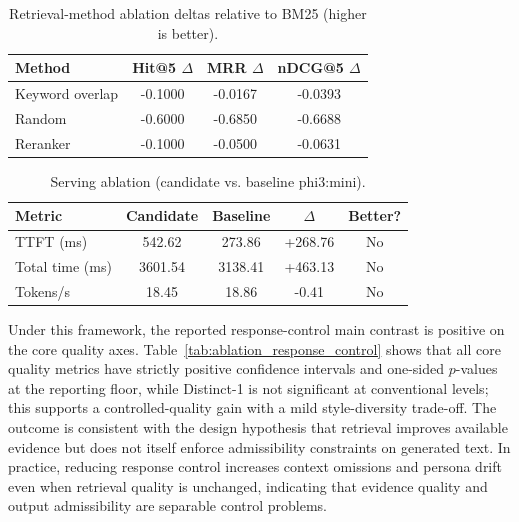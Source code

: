 ﻿\documentclass[a4paper,12pt]{article}
\begin{document}
\begin{table}[t]
\centering
\caption{Retrieval-method ablation deltas relative to BM25 (higher is better).}
\label{tab:ablation_retrieval}
\begingroup
\footnotesize
\setlength{\tabcolsep}{4pt}
\begin{tabular}{lccc}
\toprule
Method & Hit@5 \(\Delta\) & MRR \(\Delta\) & nDCG@5 \(\Delta\) \\
\midrule
Keyword overlap & -0.1000 & -0.0167 & -0.0393 \\
Random & -0.6000 & -0.6850 & -0.6688 \\
Reranker & -0.1000 & -0.0500 & -0.0631 \\
\bottomrule
\end{tabular}
\endgroup
\end{table}

\begin{table}[t]
\centering
\caption{Serving ablation (candidate vs. baseline phi3:mini).}
\label{tab:ablation_serving}
\begingroup
\footnotesize
\setlength{\tabcolsep}{4pt}
\begin{tabular}{lcccc}
\toprule
Metric & Candidate & Baseline & \(\Delta\) & Better? \\
\midrule
TTFT (ms) & 542.62 & 273.86 & +268.76 & No \\
Total time (ms) & 3601.54 & 3138.41 & +463.13 & No \\
Tokens/s & 18.45 & 18.86 & -0.41 & No \\
\bottomrule
\end{tabular}
\endgroup
\end{table}

Under this framework, the reported response-control main contrast is positive on the core quality axes. Table~\ref{tab:ablation_response_control} shows that all core quality metrics have strictly positive confidence intervals and one-sided \(p\)-values at the reporting floor, while Distinct-1 is not significant at conventional levels; this supports a controlled-quality gain with a mild style-diversity trade-off. The outcome is consistent with the design hypothesis that retrieval improves available evidence but does not itself enforce admissibility constraints on generated text. In practice, reducing response control increases context omissions and persona drift even when retrieval quality is unchanged, indicating that evidence quality and output admissibility are separable control problems.
\end{document}
